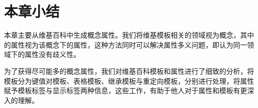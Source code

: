 %
%
\section{本章小结}

本章主要从维基百科中生成概念属性。我们将维基模板相关的领域视为概念，其中的属性视为该概念下的属性，这种方法同时可以解决属性多义问题，即认为同一领域下的属性没有歧义性。

为了获得尽可能多的概念属性，我们对维基百科模板和属性进行了细致的分析，将模板分为键值对模板、表格模板、继承模板与重定向模板，分别进行处理，将属性赋予模板标签与显示标签两种信息，这些工作，有助于他人对于属性和模板有更深入的理解。

